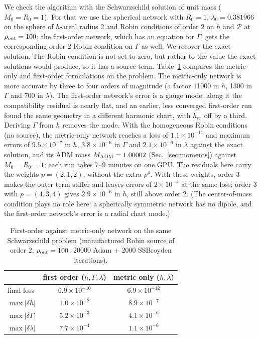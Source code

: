 \documentclass[aps,prd,twocolumn,superscriptaddress, nofootinbib,floatfix]{revtex4-2}
\begin{document}
We check the algorithm with the Schwarzschild solution of unit mass ($M_0 = R_0 = 1$).
For that we use the spherical network with $R_0=1$, $\lambda_0 = 0.381966$ on the sphere of $h$-areal radius 2 and Robin conditions of order 2 on $h$ and $\mathcal P$ at $\rho_{\rm out}=100$; the first-order network, which has an equation for $\Gamma$, gets the corresponding order-2 Robin condition on $\Gamma$ as well.
We recover the exact solution.
The Robin condition is not set to zero, but rather to the value the exact solutions would produce, so it has a source term.
Table~\ref{tab:firstorder} compares the metric-only and first-order formulations on the problem.
The metric-only network is more accurate by three to four orders of magnitude (a factor 11000 in $h$, 1300 in $\Gamma$ and 700 in $\lambda$).
The first-order network's error is a gauge mode: along it the compatibility residual is nearly flat, and an earlier, less converged first-order run found the same geometry in a different harmonic chart, with $h_{rr}$ off by a third.
Deriving $\Gamma$ from $h$ removes the mode.
With the homogeneous Robin conditions (no source), the metric-only network reaches a loss of $1.1\times10^{-11}$ and maximum errors of $9.5\times10^{-7}$ in $h$, $3.8\times10^{-6}$ in $\Gamma$ and $2.1\times10^{-6}$ in $\lambda$ against the exact solution, and its ADM mass $M_{\rm ADM} = 1.00002$ (Sec.~\ref{sec:moments}) against $M_0=R_0=1$; each run takes 7--9 minutes on one GPU.
The residuals here carry the weights $p=(2,1,2)$, without the extra $\rho^4$. With these weights, order 3 makes the outer term stiffer and leaves errors of $2\times10^{-4}$ at the same loss; order 3 with $p=(4,3,4)$ gives $2.9\times10^{-6}$ in $h$, still above order 2. (The center-of-mass condition plays no role here: a spherically symmetric network has no dipole, and the first-order network's error is a radial chart mode.)

\begin{table}
\caption{First-order against metric-only network on the same Schwarzschild problem (manufactured
Robin source of order 2, $\rho_{\rm out}=100$, 20000 Adam + 2000 SSBroyden iterations).}
\label{tab:firstorder}
\begin{ruledtabular}
\begin{tabular}{lcc}
 & first order ($h,\Gamma,\lambda$) & metric only ($h,\lambda$) \\
\hline
final loss & $6.9\times10^{-10}$ & $6.9\times10^{-12}$ \\
$\max|\delta h|$ & $1.0\times10^{-2}$ & $8.9\times10^{-7}$ \\
$\max|\delta\Gamma|$ & $5.2\times10^{-3}$ & $4.1\times10^{-6}$ \\
$\max|\delta\lambda|$ & $7.7\times10^{-4}$ & $1.1\times10^{-6}$ \\
\end{tabular}
\end{ruledtabular}
\end{table}
\end{document}
